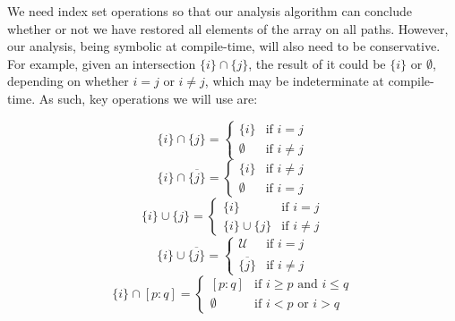 We need index set operations so that our analysis algorithm can conclude whether or not we have restored all elements of the array on all paths.
However, our analysis, being symbolic at compile-time, will also need to be conservative.
For example, given an intersection $\{i\} \cap \{j\}$, the result of it could be  $\{i\}$ or $\emptyset$, depending on whether $i=j$ or $i\ne j$, which may be indeterminate at compile-time.
As such, key operations we will use are:

$$
\{i\}\cap {\{j\}} = \left\{ \begin{array}{ccl}  \{i\} & \mbox{if }  i = j \\ \emptyset & \mbox{if }  i \ne j  \end{array}\right.
$$
$$
\{i\}\cap \overline{\{j\}} = \left\{ \begin{array}{cc}  \{i\} & \mbox{if }  i \ne j \\ \emptyset & \mbox{if }  i = j \end{array}\right. 
$$
$$
\{i\}\cup {\{j\}} = \left\{ \begin{array}{cc}  \{i\} & \mbox{if } i = j \\ \{i\}\cup {\{j\}}  & \mbox{if }  i \ne j \end{array}\right. 
$$
$$
\{i\}\cup \overline{\{j\}} = \left\{ \begin{array}{cc}  \mathcal{U} & \mbox{if } i = j \\ \overline{\{j\}} & \mbox{if }  i \ne j \end{array}\right.
$$
$$
\{i\}\cap [p:q] = \left\{ \begin{array}{cc}  [p:q] & \mbox{if } i \ge p \mbox{ and } i\le q \\ {\emptyset} & \mbox{if } i < p \mbox{ or } i> q \end{array}\right.
$$


